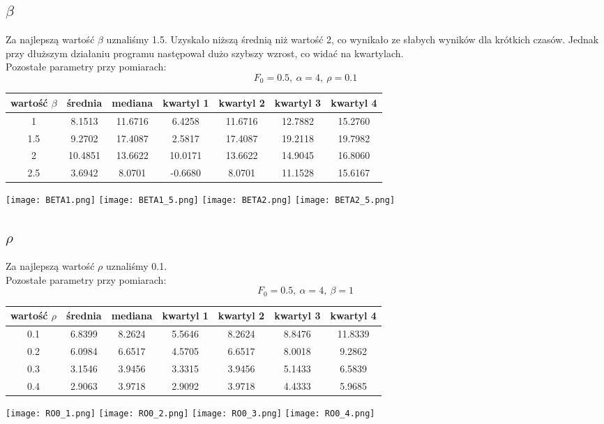 \documentclass[a4paper]{article}
\begin{document}
\subsection{$\beta$}
Za najlepszą wartość $\beta$ uznaliśmy 1.5. Uzyskało niższą średnią niż wartość 2, co wynikało ze słabych wyników dla krótkich czasów. Jednak przy dłuższym działaniu programu następował dużo szybszy wzrost, co widać na kwartylach.\\
Pozostałe parametry przy pomiarach:
$$F_0=0.5, ~ \alpha=4, ~ \rho=0.1$$
\begin{center}
\begin{tabular}{|c|c|c|c|c|c|c|}
\hline
wartość $\beta$ & średnia & mediana & kwartyl 1 & kwartyl 2 & kwartyl 3 & kwartyl 4 \\
\hline
1 & 8.1513 & 11.6716 & 6.4258 & 11.6716 & 12.7882 & 15.2760 \\
\hline
1.5 & 9.2702 & 17.4087 & 2.5817 & 17.4087 & 19.2118 & 19.7982 \\
\hline
2 & 10.4851 & 13.6622 & 10.0171 & 13.6622 & 14.9045 & 16.8060 \\
\hline
2.5 & 3.6942 & 8.0701 & -0.6680 & 8.0701 & 11.1528 & 15.6167 \\
\hline
\end{tabular}

\texttt{[image: BETA1.png]}
\texttt{[image: BETA1\_5.png]}
\texttt{[image: BETA2.png]}
\texttt{[image: BETA2\_5.png]}
\end{center}

\subsection{$\rho$}
Za najlepszą wartość $\rho$ uznaliśmy 0.1.\\
Pozostałe parametry przy pomiarach:
$$F_0=0.5, ~ \alpha=4, ~ \beta=1$$
\begin{center}
\begin{tabular}{|c|c|c|c|c|c|c|}
\hline
wartość $\rho$ & średnia & mediana & kwartyl 1 & kwartyl 2 & kwartyl 3 & kwartyl 4 \\
\hline
0.1 & 6.8399 & 8.2624 & 5.5646 & 8.2624 & 8.8476 & 11.8339 \\
\hline
0.2 & 6.0984 & 6.6517 & 4.5705 & 6.6517 & 8.0018 & 9.2862 \\
\hline
0.3 & 3.1546 & 3.9456 & 3.3315 & 3.9456 & 5.1433 & 6.5839 \\
\hline
0.4 & 2.9063 & 3.9718 & 2.9092 & 3.9718 & 4.4333 & 5.9685 \\
\hline
\end{tabular}

\texttt{[image: RO0\_1.png]}
\texttt{[image: RO0\_2.png]}
\texttt{[image: RO0\_3.png]}
\texttt{[image: RO0\_4.png]}
\end{center}
\end{document}

